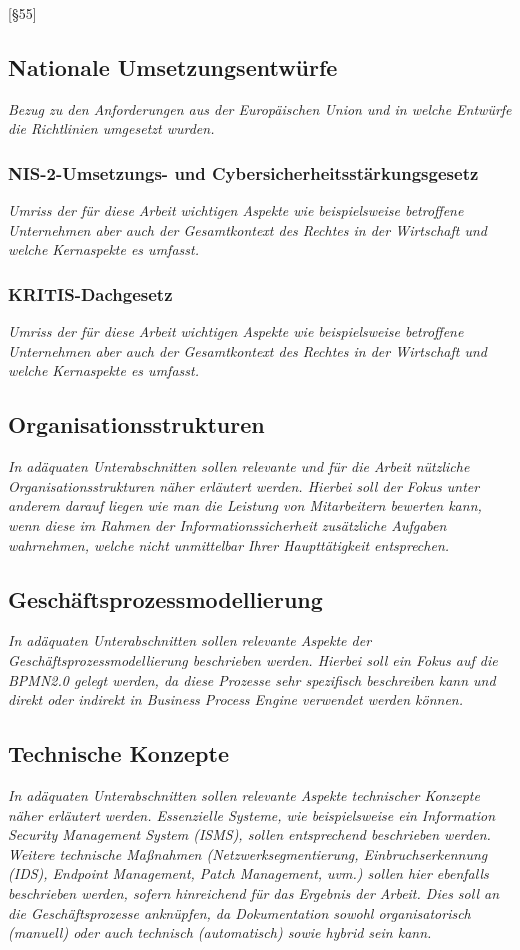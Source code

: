 \documentclass[11pt,a4paper]{article}   %
\begin{document}
        [§55]

        \subsection{Nationale Umsetzungsentwürfe}
            \emph{Bezug zu den Anforderungen aus der Europäischen Union und in welche Entwürfe die Richtlinien umgesetzt wurden.}
            \subsubsection{NIS-2-Umsetzungs- und Cybersicherheitsstärkungsgesetz}
                \emph{Umriss der für diese Arbeit wichtigen Aspekte wie beispielsweise betroffene Unternehmen aber auch der Gesamtkontext des Rechtes in der Wirtschaft und welche Kernaspekte es umfasst.}
            \subsubsection{KRITIS-Dachgesetz}
            \emph{Umriss der für diese Arbeit wichtigen Aspekte wie beispielsweise betroffene Unternehmen aber auch der Gesamtkontext des Rechtes in der Wirtschaft und welche Kernaspekte es umfasst.}
        \subsection{Organisationsstrukturen}
            \emph{In adäquaten Unterabschnitten sollen relevante und für die Arbeit nützliche Organisationsstrukturen näher erläutert werden. Hierbei soll der Fokus unter anderem darauf liegen wie man die Leistung von Mitarbeitern bewerten kann, wenn diese im Rahmen der Informationssicherheit zusätzliche Aufgaben wahrnehmen, welche nicht unmittelbar Ihrer Haupttätigkeit entsprechen.}
        \subsection{Geschäftsprozessmodellierung}
            \emph{In adäquaten Unterabschnitten sollen relevante Aspekte der Geschäftsprozessmodellierung beschrieben werden. Hierbei soll ein Fokus auf die BPMN2.0 gelegt werden, da diese Prozesse sehr spezifisch beschreiben kann und direkt oder indirekt in Business Process Engine verwendet werden können.}
        \subsection{Technische Konzepte}
            \emph{In adäquaten Unterabschnitten sollen relevante Aspekte technischer Konzepte näher erläutert werden. Essenzielle Systeme, wie beispielsweise ein Information Security Management System (ISMS), sollen entsprechend beschrieben werden. Weitere technische Maßnahmen (Netzwerksegmentierung, Einbruchserkennung (IDS), Endpoint Management, Patch Management, uvm.) sollen hier ebenfalls beschrieben werden, sofern hinreichend für das Ergebnis der Arbeit. Dies soll an die Geschäftsprozesse anknüpfen, da Dokumentation sowohl organisatorisch (manuell) oder auch technisch (automatisch) sowie hybrid sein kann.}
\end{document}
